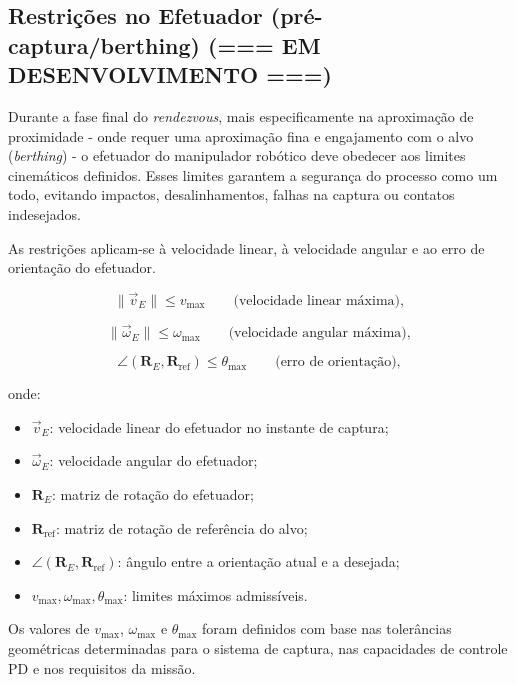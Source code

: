 \subsection{Restrições no Efetuador (pré-captura/berthing) (=== EM DESENVOLVIMENTO ===)}

Durante a fase final do \emph{rendezvous}, mais especificamente na aproximação de proximidade - onde requer uma aproximação fina e engajamento com o alvo (\emph{berthing}) - o efetuador do manipulador robótico deve obedecer aos limites cinemáticos definidos.  
Esses limites garantem a segurança do processo como um todo, evitando impactos, desalinhamentos, falhas na captura ou contatos indesejados.

As restrições aplicam-se à velocidade linear, à velocidade angular e ao erro de orientação do efetuador.

\begin{equation}
\label{eq:restr_efe_v}
\|\vec{v}_E\| \leq v_{\text{max}} \qquad \text{(velocidade linear máxima)},
\end{equation}

\begin{equation}
\label{eq:restr_efe_w}
\|\vec{\omega}_E\| \leq \omega_{\text{max}} \qquad \text{(velocidade angular máxima)},
\end{equation}

\begin{equation}
\label{eq:restr_efe_orient}
\angle(\mathbf{R}_E, \mathbf{R}_{\text{ref}}) \leq \theta_{\text{max}} \qquad \text{(erro de orientação)},
\end{equation}

onde:
\begin{itemize}
    \item $\vec{v}_E$: velocidade linear do efetuador no instante de captura;
    \item $\vec{\omega}_E$: velocidade angular do efetuador;
    \item $\mathbf{R}_E$: matriz de rotação do efetuador;
    \item $\mathbf{R}_{\text{ref}}$: matriz de rotação de referência do alvo;
    \item $\angle(\mathbf{R}_E, \mathbf{R}_{\text{ref}})$: ângulo entre a orientação atual e a desejada;
    \item $v_{\text{max}}, \omega_{\text{max}}, \theta_{\text{max}}$: limites máximos admissíveis.
\end{itemize}

Os valores de $v_{\text{max}}$, $\omega_{\text{max}}$ e $\theta_{\text{max}}$ foram definidos com base nas tolerâncias geométricas determinadas para o sistema de captura, nas capacidades de controle PD e nos requisitos da missão.
